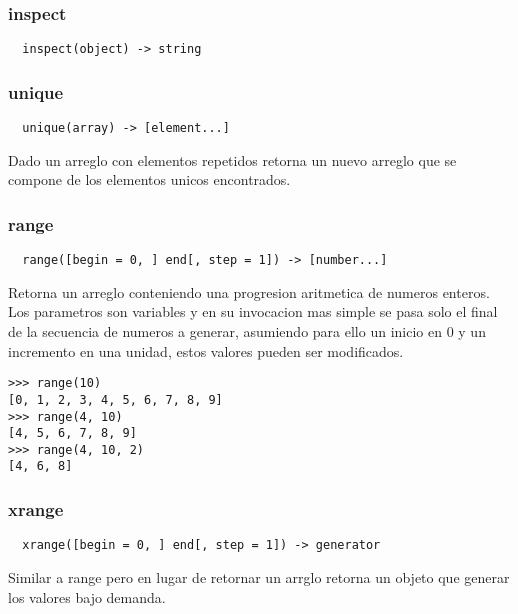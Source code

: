 \subsubsection*{inspect}
\begin{verbatim}
  inspect(object) -> string
\end{verbatim}

\subsubsection*{unique}
\begin{verbatim}
  unique(array) -> [element...]
\end{verbatim}
Dado un arreglo con elementos repetidos retorna un nuevo arreglo que se compone
de los elementos unicos encontrados.

\subsubsection*{range}
\begin{verbatim}
  range([begin = 0, ] end[, step = 1]) -> [number...]
\end{verbatim}
Retorna un arreglo conteniendo una progresion aritmetica de numeros enteros.
Los parametros son variables y en su invocacion mas simple se pasa solo el final
de la secuencia de numeros a generar, asumiendo para ello un inicio en 0 y un
incremento en una unidad, estos valores pueden ser modificados.
\begin{lstlisting}[style=consola]
>>> range(10)
[0, 1, 2, 3, 4, 5, 6, 7, 8, 9]
>>> range(4, 10)
[4, 5, 6, 7, 8, 9]
>>> range(4, 10, 2)
[4, 6, 8]
\end{lstlisting}

\subsubsection*{xrange}
\begin{verbatim}
  xrange([begin = 0, ] end[, step = 1]) -> generator
\end{verbatim}
Similar a range pero en lugar de retornar un arrglo retorna un objeto que
generar los valores bajo demanda.

